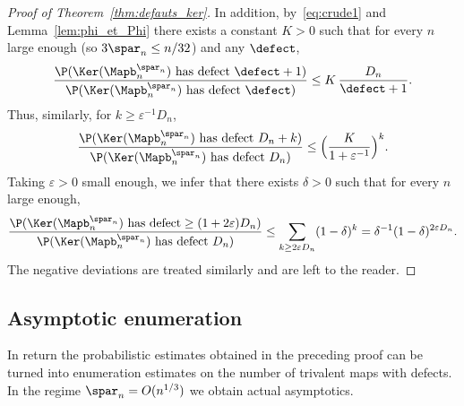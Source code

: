 \begin{proof}[Proof of Theorem~\ref{thm:defauts_ker}]
In addition, by~\eqref{eq:crude1} and Lemma~\ref{lem:phi_et_Phi} there exists a constant $K>0$ such that for every $n$ large enough (so \eg $3\spar_n \le n/32$) and any $\defect$,
\[
\frac{\P(\Ker(\Mapb_n^{\spar_n}) \textrm{ has defect } \defect+1)}{\P(\Ker(\Mapb_n^{\spar_n}) \textrm{ has defect } \defect)}
\le K\, \frac{D_n}{\defect+1}.
\]
Thus, similarly, for $k \ge \varepsilon^{-1} D_n$,
\[
\frac{\P(\Ker(\Mapb_n^{\spar_n}) \textrm{ has defect } D_n+k)}{\P(\Ker(\Mapb_n^{\spar_n}) \textrm{ has defect } D_n)}
\le \Bigl(\frac{K}{1+\varepsilon^{-1}}\Bigr)^k.
\]
Taking $\varepsilon>0$ small enough, we infer that there exists $\delta > 0$ such that for every $n$ large enough,
\[
\frac{\P(\Ker(\Mapb_n^{\spar_n}) \textrm{ has defect} \ge (1+2\varepsilon) D_n)}{\P(\Ker(\Mapb_n^{\spar_n}) \textrm{ has defect } D_n)}
\le \sum_{k \ge 2\varepsilon D_n} (1-\delta)^k = \delta^{-1} (1-\delta)^{2\varepsilon D_n}.
\]
The negative deviations are treated similarly and are left to the reader.
\end{proof}

\subsection{Asymptotic enumeration}
\label{ssec:asymp_enum}
In return the probabilistic estimates obtained in the preceding proof can be turned into enumeration estimates on the number of trivalent maps with defects. In the regime $\spar_{n} = O(n^{1/3})$ we obtain actual asymptotics.

